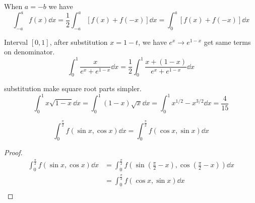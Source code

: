 \documentclass{overview}
\begin{document}
\begin{theorem}
	When $a=-b$ we have
	\[
		\int_{-a}^{a} f(x) \dd x =  \frac{1}{2} \int_{-a}^{a} [f(x) + f(-x)] \dd x
		= \int_0^{a} [f(x) + f(-x)] \dd x
	\]
\end{theorem}

\begin{example}
	Interval $[0, 1]$, after substitution $x = 1 - t$,
	we have  $e^{x} \to e^{1-x}$ get same terms on denominator.
	\[
		\int_0^1 \frac{x}{e^{x} + e^{1-x}} \dd x
		= \frac{1}{2} \int_0^1 \frac{x + (1-x)}{e^{x} + e^{1-x}} \dd x
	\] 
\end{example}

\begin{example} substitution make square root parts simpler.
	\[
		\int_0^{1} x \sqrt{1-x} \dd x
		= \int_0^{1} (1-x) \sqrt{x} \dd x
		= \int_0^{1} x^{1/2} - x^{3/2} \dd x
		= \frac{4}{15}
	\] 
\end{example}

\begin{theorem}[Inference 1]
	\[
		\int_0^{\frac{\pi}{2}} f(\sin x, \cos x) \dd x = \int_0^{\frac{\pi}{2}} f(\cos x, \sin x) \dd x
	\] 
\begin{proof}
	\[
		\begin{aligned}
		\int_0^{\frac{\pi}{2}} f(\sin x, \cos x) \dd x
		&= \int_0^{\frac{\pi}{2}} f(\sin(\frac{\pi}{2} - x), \cos(\frac{\pi}{2} - x)) \dd x \\
		&= \int_0^{\frac{\pi}{2}} f(\cos x, \sin x) \dd x \\
		\end{aligned}
	\]
\end{proof}
\end{theorem}
\end{document}
